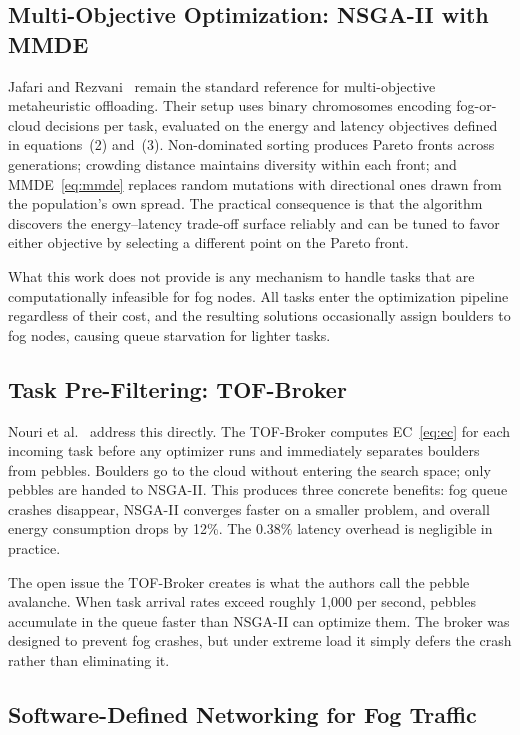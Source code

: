 \documentclass[12pt,a4paper]{article}
\begin{document}
\subsection{Multi-Objective Optimization: NSGA-II with MMDE}

Jafari and Rezvani~\cite{jafari2021} remain the standard reference for
multi-objective metaheuristic offloading. Their setup uses binary chromosomes
encoding fog-or-cloud decisions per task, evaluated on the energy and latency
objectives defined in equations~(2) and~(3). Non-dominated sorting produces Pareto
fronts across generations; crowding distance maintains diversity within each front;
and MMDE~\eqref{eq:mmde} replaces random mutations with directional ones drawn
from the population's own spread. The practical consequence is that the algorithm
discovers the energy--latency trade-off surface reliably and can be tuned to favor
either objective by selecting a different point on the Pareto front.

What this work does not provide is any mechanism to handle tasks that are
computationally infeasible for fog nodes. All tasks enter the optimization
pipeline regardless of their cost, and the resulting solutions occasionally
assign boulders to fog nodes, causing queue starvation for lighter tasks.

\subsection{Task Pre-Filtering: TOF-Broker}

Nouri et al.~\cite{nouri2024tof} address this directly. The TOF-Broker computes
EC~\eqref{eq:ec} for each incoming task before any optimizer runs and immediately
separates boulders from pebbles. Boulders go to the cloud without entering the
search space; only pebbles are handed to NSGA-II. This produces three concrete
benefits: fog queue crashes disappear, NSGA-II converges faster on a smaller
problem, and overall energy consumption drops by 12\%. The 0.38\% latency
overhead is negligible in practice.

The open issue the TOF-Broker creates is what the authors call the pebble avalanche.
When task arrival rates exceed roughly 1,000 per second, pebbles accumulate in
the queue faster than NSGA-II can optimize them. The broker was designed to prevent
fog crashes, but under extreme load it simply defers the crash rather than
eliminating it.

\subsection{Software-Defined Networking for Fog Traffic}
\end{document}
